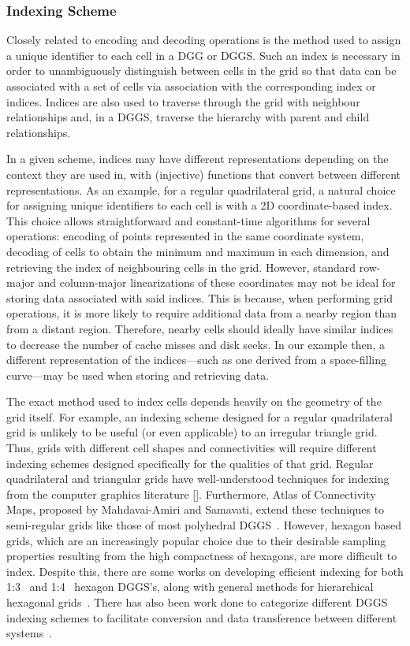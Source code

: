 \subsubsection{Indexing Scheme} \label{sec::dggs:indexing}
Closely related to encoding and decoding operations is the method used to assign a unique identifier to each cell in a DGG or DGGS.
Such an index is necessary in order to unambiguously distinguish between cells in the grid so that data can be associated with a set of cells via association with the corresponding index or indices.
Indices are also used to traverse through the grid with neighbour relationships and, in a DGGS, traverse the hierarchy with parent and child relationships.


In a given scheme, indices may have different representations depending on the context they are used in, with (injective) functions that convert between different representations.
As an example, for a regular quadrilateral grid, a natural choice for assigning unique identifiers to each cell is with a 2D coordinate-based index.
This choice allows straightforward and constant-time algorithms for several operations: encoding of points represented in the same coordinate system, decoding of cells to obtain the minimum and maximum in each dimension, and retrieving the index of neighbouring cells in the grid.
However, standard row-major and column-major linearizations of these coordinates may not be ideal for storing data associated with said indices.
This is because, when performing grid operations, it is more likely to require additional data from a nearby region than from a distant region.
Therefore, nearby cells should ideally have similar indices to decrease the number of cache misses and disk seeks.
In our example then, a different representation of the indices---such as one derived from a space-filling curve---may be used when storing and retrieving data.


The exact method used to index cells depends heavily on the geometry of the grid itself.
For example, an indexing scheme designed for a regular quadrilateral grid is unlikely to be useful (or even applicable) to an irregular triangle grid.
Thus, grids with different cell shapes and connectivities will require different indexing schemes designed specifically for the qualities of that grid.
Regular quadrilateral and triangular grids have well-understood techniques for indexing from the computer graphics literature [].
Furthermore, Atlas of Connectivity Maps, proposed by Mahdavai-Amiri and Samavati, extend these techniques to semi-regular grids like those of most polyhedral DGGS~\cite{mahdavi2014atlas}.
However, hexagon based grids, which are an increasingly popular choice due to their desirable sampling properties resulting from the high compactness of hexagons, are more difficult to index.
Despite this, there are some works on developing efficient indexing for both 1:3~\cite{vince2006indexing} and 1:4~\cite{tong2013efficient} hexagon DGGS's, along with general methods for hierarchical hexagonal grids~\cite{mahdavi2015hexagonal}.
There has also been work done to categorize different DGGS indexing schemes to facilitate conversion and data transference between different systems~\cite{mahdavi2015categorization}.


